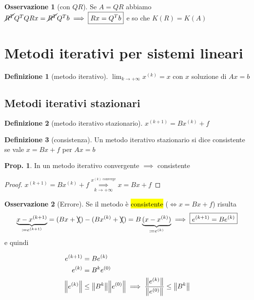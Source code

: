 \documentclass[a4paper,10pt]{article}
\theoremstyle{definition}
\theoremstyle{indentdefinition}
\newtheorem{defn}{Definizione}[section]
\theoremstyle{indenttheorem}
\newtheorem{prop}{Prop.}
\theoremstyle{myremark}
\newtheorem*{rem*}{Osservazione}
\theoremstyle{indentgeneral}
\theoremstyle{plain}
\theoremstyle{plain}
\begin{document}
\begin{rem*}[con $QR$] Se $A=QR$ abbiamo $\cancel{R^T}Q^TQRx=\cancel{R^T}Q^Tb\implies \boxed{Rx=Q^Tb}$ e so che $K(R)=K(A)$
    
\end{rem*}


\pagebreak{}

\section{Metodi iterativi per sistemi lineari}
\begin{defn}[metodo iterativo]
$\lim_{k\rightarrow+\infty}x^{\left(k\right)}=x$ con $x$ soluzione
di $Ax=b$
\end{defn}


\subsection{Metodi iterativi stazionari}
\begin{defn}[metodo iterativo stazionario]
\label{def:metodo-iterativo-stazionario}$x^{\left(k+1\right)}=Bx^{\left(k\right)}+f$
\end{defn}

\begin{defn}[consistenza]
Un metodo iterativo stazionario si dice consistente se vale $x=Bx+f$
per $Ax=b$
\end{defn}

\begin{prop}
In un metodo iterativo convergente $\implies$ consistente
\end{prop}
\begin{proof}
$x^{\left(k+1\right)}=Bx^{\left(k\right)}+f\underset{k\to+\infty}{\overset{x^{(k)\text{ converge}}}{\implies}}x=Bx+f$
\end{proof}

\begin{rem*}[Errore]
    Se il metodo è \hl{consistente} ($\iff x=Bx+ f$) risulta $$\underbrace{x-x^{(k+1)}}_{\coloneqq e^{(k+1)}}=(Bx+\bcancel{f})-(Bx^{(k)}+\bcancel{f})=B\underbrace{(x-x^{(k)})}_{\coloneqq e^{(k)}}\implies \boxed{e^{(k+1)}=Be^{(k)}}$$ e quindi
    
    \begin{align*}
    e^{(k+1)}&=Be^{(k)}\\
        e^{(k)}&=B^{k}e^{(0)} \\
         \norm{e^{(k)}}&\le \norm{B^{k}}\norm{e^{(0)}} \implies \frac{ \norm{e^{(k)}}}{\norm{e^{(0)}}}\le\norm{B^{k}}
    \end{align*}
\end{rem*}
\end{document}
